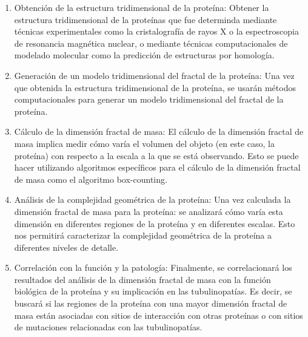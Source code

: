 \documentclass[11pt]{article}
\begin{document}
\begin{enumerate}
	
\item Obtención de la estructura tridimensional de la proteína: Obtener la estructura tridimensional de la proteínas que fue determinda mediante técnicas experimentales como la cristalografía de rayos X o la espectroscopia de resonancia magnética nuclear, o mediante técnicas computacionales de modelado molecular como la predicción de estructuras por homología.

\item Generación de un modelo tridimensional del fractal de la proteína: Una vez que obtenida la estructura tridimensional de la proteína, se  usarán métodos computacionales para generar un modelo tridimensional del fractal de la proteína. 

\item Cálculo de la dimensión fractal de masa: El cálculo de la dimensión fractal de masa implica medir cómo varía el volumen del objeto (en este caso, la proteína) con respecto a la escala a la que se está observando. Esto se puede hacer utilizando algoritmos específicos para el cálculo de la dimensión fractal de masa como el algoritmo box-counting.

\item Análisis de la complejidad geométrica de la proteína: Una vez calculada la dimensión fractal de masa para la proteína: se analizará cómo varía esta dimensión en diferentes regiones de la proteína y en diferentes escalas. Esto nos permitirá caracterizar la complejidad geométrica de la proteína a diferentes niveles de detalle.

\item Correlación con la función y la patología: Finalmente, se correlacionará los resultados del análisis de la dimensión fractal de masa con la función biológica de la proteína y su implicación en las tubulinopatías.  Es decir, se buscará si las regiones de la proteína con una mayor dimensión fractal de masa están asociadas con sitios de interacción con otras proteínas o con sitios de mutaciones relacionadas con las tubulinopatías.

\end{enumerate}

\clearpage
\end{document}
